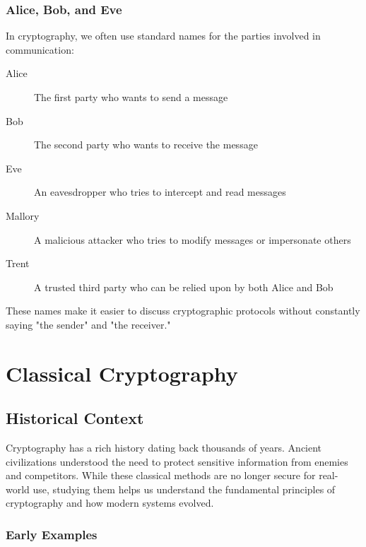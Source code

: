 \documentclass[11pt,a4paper]{report}
\begin{document}
\subsection{Alice, Bob, and Eve}

In cryptography, we often use standard names for the parties involved in communication:

\begin{description}
\item[Alice] The first party who wants to send a message
\item[Bob] The second party who wants to receive the message
\item[Eve] An eavesdropper who tries to intercept and read messages
\item[Mallory] A malicious attacker who tries to modify messages or impersonate others
\item[Trent] A trusted third party who can be relied upon by both Alice and Bob
\end{description}

These names make it easier to discuss cryptographic protocols without constantly saying "the sender" and "the receiver."


\printcursols
\newpage
\chapter{Classical Cryptography}

\section{Historical Context}

Cryptography has a rich history dating back thousands of years. Ancient civilizations understood the need to protect sensitive information from enemies and competitors. While these classical methods are no longer secure for real-world use, studying them helps us understand the fundamental principles of cryptography and how modern systems evolved.

\subsection{Early Examples}
\end{document}
